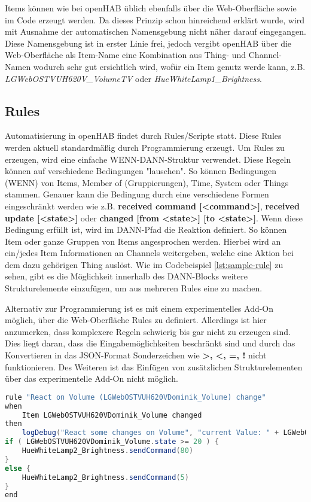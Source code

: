 Items können wie bei openHAB üblich ebenfalls über die Web-Oberfläche sowie im Code erzeugt werden. Da dieses Prinzip schon hinreichend erklärt wurde, wird mit Ausnahme der automatischen Namensgebung nicht näher darauf eingegangen. Diese Namensgebung ist in erster Linie frei, jedoch vergibt openHAB über die Web-Oberfläche als Item-Name eine Kombination aus Thing- und Channel-Namen wodurch sehr gut ersichtlich wird, wofür ein Item genutz werde kann, z.B. \textit{LGWebOSTVUH620V\_VolumeTV} oder \textit{HueWhiteLamp1\_Brightness}.

\subsection{Rules}
Automatisierung in openHAB findet durch Rules/Scripte statt. Diese Rules werden aktuell standardmäßig durch Programmierung erzeugt. Um Rules zu erzeugen, wird eine einfache WENN-DANN-Struktur verwendet. Diese Regeln können auf verschiedene Bedingungen "lauschen". So können Bedingungen (WENN) von Items, Member of (Gruppierungen), Time, System oder Things stammen. Genauer kann die Bedingung durch eine verschiedene Formen eingeschränkt werden wie z.B. \textbf{received command [<command>]},  \textbf{received update [<state>]} oder \textbf{changed [from <state>] [to <state>]}.
Wenn diese Bedingung erfüllt ist, wird im DANN-Pfad die Reaktion definiert. So können Item oder ganze Gruppen von Items angesprochen werden. Hierbei wird an ein/jedes Item Informationen an Channels weitergeben, welche eine Aktion bei dem dazu gehörigen Thing auslöst.
Wie im Codebeispiel \ref{lst:sample-rule} zu sehen, gibt es die Möglichkeit innerhalb des DANN-Blocks weitere Strukturelemente einzufügen, um aus mehreren Rules eine zu machen.

Alternativ zur Programmierung ist es mit einem experimentelles Add-On möglich, über die Web-Oberfläche Rules zu definiert. Allerdings ist hier anzumerken, dass komplexere Regeln schwierig bis gar nicht zu erzeugen sind. Dies liegt daran, dass die Eingabemöglichkeiten beschränkt sind und durch das Konvertieren in das JSON-Format Sonderzeichen wie \textbf{>, <, =, !} nicht funktionieren. Des Weiteren ist das Einfügen von zusätzlichen Strukturelementen über das experimentelle Add-On nicht möglich.

\smallskip
\begin{lstlisting}[language=java,firstnumber=1,caption=Rule Beispiel,label=lst:sample-rule]
rule "React on Volume (LGWebOSTVUH620VDominik_Volume) change"
when
	Item LGWebOSTVUH620VDominik_Volume changed
then
	logDebug("React some changes on Volume", "current Value: " + LGWebOSTVUH620VDominik_Volume.state.toString)
if ( LGWebOSTVUH620VDominik_Volume.state >= 20 ) {
	HueWhiteLamp2_Brightness.sendCommand(80)
}
else {
	HueWhiteLamp2_Brightness.sendCommand(5)
}
end
\end{lstlisting}

